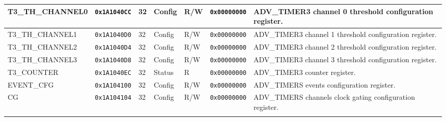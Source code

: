 {\begin{tabularx}{\textwidth}{|l|l|l|l|l|l|X|}
  \hline
  T3\_TH\_CHANNEL0 & \texttt{0x1A1040CC} & 32 & Config & R/W & \texttt{0x00000000} & ADV\_TIMER3 channel 0 threshold configuration register.\\
  \hline
  T3\_TH\_CHANNEL1 & \texttt{0x1A1040D0} & 32 & Config & R/W & \texttt{0x00000000} & ADV\_TIMER3 channel 1 threshold configuration register.\\
  \hline
  T3\_TH\_CHANNEL2 & \texttt{0x1A1040D4} & 32 & Config & R/W & \texttt{0x00000000} & ADV\_TIMER3 channel 2 threshold configuration register.\\
  \hline
  T3\_TH\_CHANNEL3 & \texttt{0x1A1040D8} & 32 & Config & R/W & \texttt{0x00000000} & ADV\_TIMER3 channel 3 threshold configuration register.\\
  \hline
  T3\_COUNTER & \texttt{0x1A1040EC} & 32 & Status & R & \texttt{0x00000000} & ADV\_TIMER3 counter register.\\
  \hline
  EVENT\_CFG & \texttt{0x1A104100} & 32 & Config & R/W & \texttt{0x00000000} & ADV\_TIMERS events configuration register.\\
  \hline
  CG & \texttt{0x1A104104} & 32 & Config & R/W & \texttt{0x00000000} & ADV\_TIMERS channels clock gating configuration register.\\
  \hline
  \caption{APB Advanced Timer}
\end{tabularx}
}




